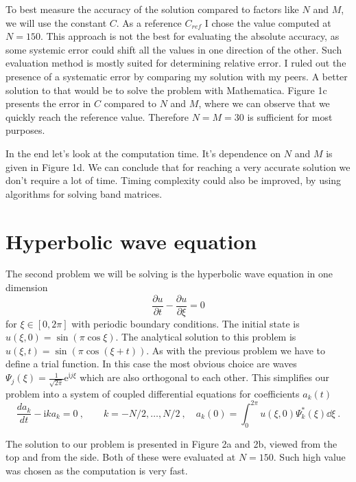 \documentclass[12pt, a4paper]{article}
\begin{document}
To best measure the accuracy of the solution compared to factors like $N$ and $M$, we will use the constant $C$. As a reference $C_{ref}$ I chose the value computed at $N = 150$. This approach is not the best for evaluating the absolute accuracy, as some systemic error could shift all the values in one direction of the other. Such evaluation method is mostly suited for determining relative error. I ruled out the presence of a systematic error by comparing my solution with my peers. A better solution to that would be to solve the problem with Mathematica. Figure 1c presents the error in $C$ compared to $N$ and $M$, where we can observe that we quickly reach the reference value. Therefore $N = M = 30$ is sufficient for most purposes.

In the end let's look at the computation time. It's dependence on $N$ and $M$ is given in Figure 1d. We can conclude that for reaching a very accurate solution we don't require a lot of time. Timing complexity could also be improved, by using algorithms for solving band matrices.

\section{Hyperbolic wave equation}

The second problem we will be solving is the hyperbolic wave equation in one dimension
\begin{equation*}
  \frac{\partial u}{\partial t} - \frac{\partial u}{\partial \xi} = 0
\end{equation*}
for $\xi \in [0,2\pi]$ with periodic boundary conditions. The initial state is $u(\xi,0)=\sin(\pi\cos \xi)$. The analytical solution to this problem is $u(\xi,t)=\sin(\pi\cos(\xi+t))$. As with the previous problem we have to define a trial function. In this case the most obvious choice are waves $\Psi_j(\xi) = \frac{1}{\sqrt{2\pi}} \mathrm{e}^{\mathrm{i}j\xi}$ which are also orthogonal to each other. This simplifies our problem into a system of coupled differential equations for coefficients $a_k(t)$
\begin{equation*}
  \frac{da_k}{dt} - \mathrm{i}ka_k = 0 \>, \qquad
  k = -N/2, \dots, N/2 \>, \quad 
  a_k(0) = \int_0^{2\pi} u(\xi,0) \Psi^*_k(\xi) \dd \xi \>.
\end{equation*}

The solution to our problem is presented in Figure 2a and 2b, viewed from the top and from the side. Both of these were evaluated at $N = 150$. Such high value was chosen as the computation is very fast.
\end{document}
